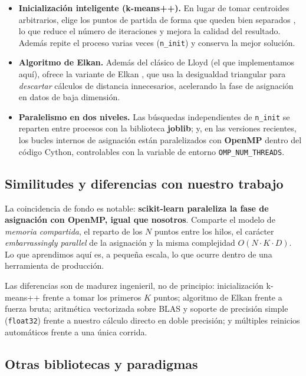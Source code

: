 \documentclass[conference]{IEEEtran}
\begin{document}
\begin{itemize}
  \item \textbf{Inicializaci\'on inteligente (k-means++).} En lugar de tomar
        centroides arbitrarios, elige los puntos de partida de forma que queden
        bien separados \cite{arthur2007}, lo que reduce el n\'umero de
        iteraciones y mejora la calidad del resultado. Adem\'as repite el
        proceso varias veces (\texttt{n\_init}) y conserva la mejor soluci\'on.
  \item \textbf{Algoritmo de Elkan.} Adem\'as del cl\'asico de Lloyd (el que
        implementamos aqu\'i), ofrece la variante de Elkan \cite{elkan2003}, que
        usa la desigualdad triangular para \emph{descartar} c\'alculos de
        distancia innecesarios, acelerando la fase de asignaci\'on en datos de
        baja dimensi\'on.
  \item \textbf{Paralelismo en dos niveles.} Las b\'usquedas independientes de
        \texttt{n\_init} se reparten entre procesos con la biblioteca
        \textbf{joblib}; y, en las versiones recientes, los bucles internos de
        asignaci\'on est\'an paralelizados con \textbf{OpenMP} dentro del
        c\'odigo Cython, controlables con la variable de entorno
        \texttt{OMP\_NUM\_THREADS}.
\end{itemize}

\subsection{Similitudes y diferencias con nuestro trabajo}

La coincidencia de fondo es notable: \textbf{scikit-learn paraleliza la fase de
asignaci\'on con OpenMP, igual que nosotros}. Comparte el modelo de
\emph{memoria compartida}, el reparto de los $N$ puntos entre los hilos, el
car\'acter \emph{embarrassingly parallel} de la asignaci\'on y la misma
complejidad $O(N\cdot K\cdot D)$. Lo que aprendimos aqu\'i es, a peque\~na
escala, lo que ocurre dentro de una herramienta de producci\'on.

Las diferencias son de madurez ingenieril, no de principio:
inicializaci\'on k-means++ frente a tomar los primeros $K$ puntos; algoritmo de
Elkan frente a fuerza bruta; aritm\'etica vectorizada sobre BLAS y soporte de
precisi\'on simple (\texttt{float32}) frente a nuestro c\'alculo directo en
doble precisi\'on; y m\'ultiples reinicios autom\'aticos frente a una \'unica
corrida.

\subsection{Otras bibliotecas y paradigmas}
\end{document}
